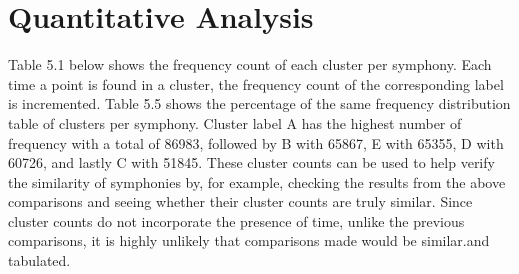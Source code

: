 \section{Quantitative Analysis}

Table 5.1 below shows the frequency count of each cluster per symphony. Each time a point is found in a cluster, the frequency count of the corresponding label is incremented. Table 5.5 shows the percentage of the same frequency distribution table of clusters per symphony. Cluster label A has the highest number of frequency with a total of 86983, followed by B with 65867, E with 65355, D with 60726, and lastly C with 51845. These cluster counts can be used to help verify the similarity of symphonies by, for example, checking the results from the above comparisons and seeing whether their cluster counts are truly similar. Since cluster counts do not incorporate the presence of time, unlike the previous comparisons, it is highly unlikely that comparisons made would be similar.and tabulated.


